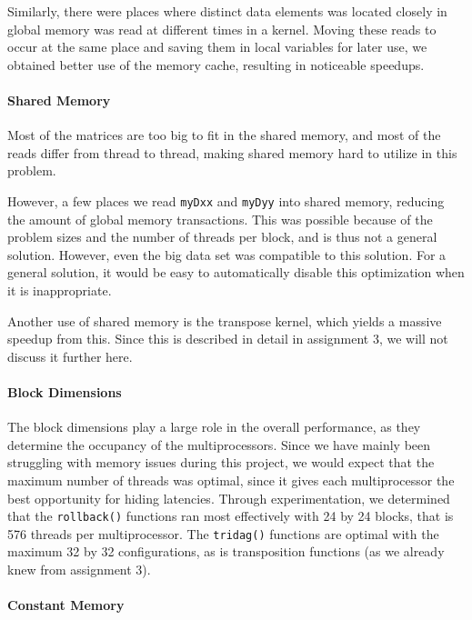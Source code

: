 \documentclass[11pt]{article}
\begin{document}
Similarly, there were places where distinct data elements was located closely in global memory was read at different times in a kernel.
Moving these reads to occur at the same place and saving them in local variables for later use, we obtained better use of the memory cache, resulting in noticeable speedups.

\paragraph{Shared Memory\\}
Most of the matrices are too big to fit in the shared memory, and most of the reads differ from thread to thread, making shared memory hard to utilize in this problem.

However, a few places we read \texttt{myDxx} and \texttt{myDyy} into shared memory, reducing the amount of global memory transactions.
This was possible because of the problem sizes and the number of threads per block, and is thus not a general solution.
However, even the big data set was compatible to this solution.
For a general solution, it would be easy to automatically disable this optimization when it is inappropriate.

Another use of shared memory is the transpose kernel, which yields a massive speedup from this.
Since this is described in detail in assignment 3, we will not discuss it further here.

\paragraph{Block Dimensions\\}

The block dimensions play a large role in the overall performance, as they determine the occupancy of the multiprocessors.
Since we have mainly been struggling with memory issues during this project, we would expect that the maximum number of threads was optimal, since it gives each multiprocessor the best opportunity for hiding latencies.
Through experimentation, we determined that the \texttt{rollback()} functions ran most effectively with 24 by 24 blocks, that is 576 threads per multiprocessor.
The \texttt{tridag()} functions are optimal with the maximum 32 by 32 configurations, as is transposition functions (as we already knew from assignment 3).

\paragraph{Constant Memory\\}
\end{document}

